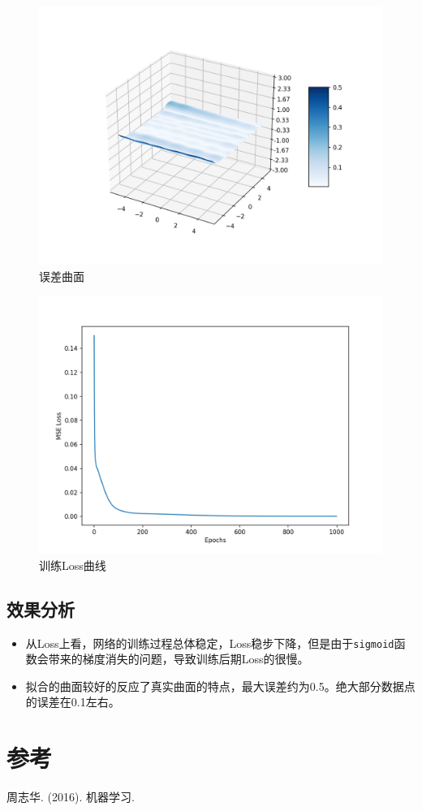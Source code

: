 \documentclass[UTF8]{ctexart}
\begin{document}
\begin{figure}[htbp]
    \centering
    \includegraphics[width=5in]{figures/error.png}
    \caption{误差曲面}
    \label{fig:predict}
\end{figure}

\begin{figure}[htbp]
    \centering
    \includegraphics[width=5in]{figures/loss.png}
    \caption{训练Loss曲线}
    \label{fig:predict}
\end{figure}
\subsection{效果分析}
\begin{itemize}
    \item 从Loss上看，网络的训练过程总体稳定，Loss稳步下降，但是由于\texttt{sigmoid}函数会带来的梯度消失的问题，导致训练后期Loss的很慢。
    \item 拟合的曲面较好的反应了真实曲面的特点，最大误差约为0.5。绝大部分数据点的误差在0.1左右。
\end{itemize}


\section{参考}
周志华. (2016). 机器学习. 
\end{document}
